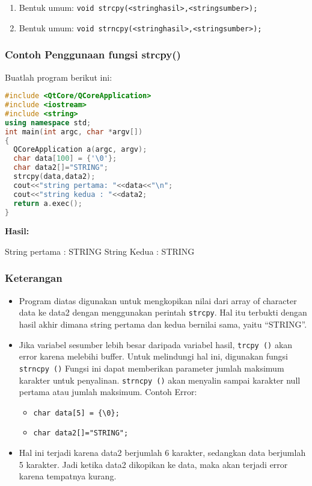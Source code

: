 \begin{enumerate}

\item
  Bentuk umum:
  \texttt{void\ strcpy(\textless{}stringhasil\textgreater{},\textless{}stringsumber\textgreater{});}
\item
  Bentuk umum:
  \texttt{void\ strncpy(\textless{}stringhasil\textgreater{},\textless{}stringsumber\textgreater{});}
\end{enumerate}

\subsubsection*{Contoh  Penggunaan fungsi strcpy()}

Buatlah program berikut ini:

\begin{lstlisting}[language=c++, caption=Penggunaan fungsi strcpy(), label=contoh3-21]
#include <QtCore/QCoreApplication>
#include <iostream>
#include <string>
using namespace std;
int main(int argc, char *argv[])
{
  QCoreApplication a(argc, argv);
  char data[100] = {'\0'};
  char data2[]="STRING";
  strcpy(data,data2);
  cout<<"string pertama: "<<data<<"\n";
  cout<<"string kedua : "<<data2;
  return a.exec();
}
\end{lstlisting}

\textbf{Hasil:}
\begin{lcverbatim}
String pertama : STRING
String Kedua : STRING
\end{lcverbatim}


\subsubsection*{Keterangan}

\begin{itemize}
\item
  Program diatas digunakan untuk mengkopikan nilai dari array of
  character data ke data2 dengan menggunakan perintah \texttt{strcpy}.
  Hal itu terbukti dengan hasil akhir dimana string pertama dan kedua
  bernilai sama, yaitu ``STRING''.
\item
  Jika variabel sesumber lebih besar daripada variabel hasil,
  \texttt{trcpy\ ()} akan error karena melebihi buffer. Untuk melindungi
  hal ini, digunakan fungsi \texttt{strncpy\ ()} Fungsi ini dapat
  memberikan parameter jumlah maksimum karakter untuk penyalinan.
  \texttt{strncpy\ ()} akan menyalin sampai karakter null pertama atau
  jumlah maksimum. Contoh Error:

  \begin{itemize}
  
  \item
    \texttt{char\ data{[}5{]}\ =\ \{\textquotesingle{}\textbackslash{}0\textquotesingle{}\};}
  \item
    \texttt{char\ data2{[}{]}="STRING";}
  \end{itemize}
\item
  Hal ini terjadi karena data2 berjumlah 6 karakter, sedangkan data
  berjumlah 5 karakter. Jadi ketika data2 dikopikan ke data, maka akan
  terjadi error karena tempatnya kurang.
\end{itemize}

